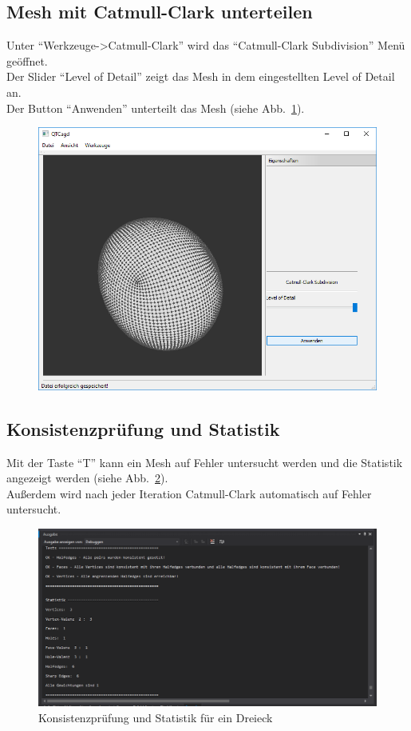 \subsection{Mesh mit Catmull-Clark unterteilen}
Unter "`Werkzeuge->Catmull-Clark"' wird das "`Catmull-Clark Subdivision"' Menü geöffnet.\\
Der Slider "`Level of Detail"' zeigt das Mesh in dem eingestellten Level of Detail an.\\
Der Button "`Anwenden"' unterteilt das Mesh (siehe Abb.~\ref{fig:MeshCatmullClark}).
\begin{figure}[ht!]
	\centering
	\includegraphics[scale=0.6]{content/pictures/8-MeshCatmullClark}
	\caption{}
	\label{fig:MeshCatmullClark}
\end{figure}
\subsection{Konsistenzprüfung und Statistik}
Mit der Taste "`T"' kann ein Mesh auf Fehler untersucht werden und die Statistik angezeigt werden (siehe Abb.~\ref{fig:TestStatistik}).\\
Au\ss{}erdem wird nach jeder Iteration Catmull-Clark automatisch auf Fehler untersucht.
\begin{figure}[ht!]
	\centering
	\includegraphics[scale=0.6]{content/pictures/9-TestStatistik}
	\caption{Konsistenzprüfung und Statistik für ein Dreieck}
	\label{fig:TestStatistik}
\end{figure}
